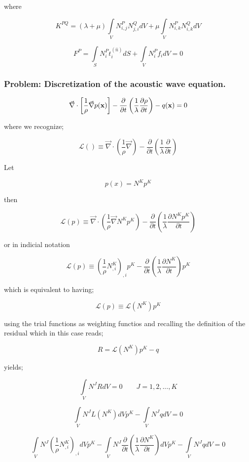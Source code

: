 where

\[{K^{PQ}} = (\lambda  + \mu )\int\limits_V {N_{i,j}^PN_{j,i}^QdV}  + \mu \int\limits_V {N_{i,k}^PN_{i,k}^QdV} \]

\[{F^P} = \int\limits_S {N_i^Pt_i^{(\hat n)}dS + \int\limits_V {N_i^P{f_i}dV = 0} } \]

\subsubsection*{Problem: Discretization of the acoustic wave equation.}

\[\vec \nabla  \cdot \left[ {\frac{1}{\rho }\vec \nabla p(\vb{x})} \right] - \frac{\partial }{{\partial t}}\left( {\frac{1}{\lambda }\frac{{\partial \rho }}{{\partial t}}} \right) - q(\vb{x}) = 0\]

where we recognize;

\[\mathcal{L}() \equiv \vec \nabla  \cdot \left( {\frac{1}{\rho }\vec \nabla } \right) - \frac{\partial }{{\partial t}}\left( {\frac{1}{\lambda }\frac{\partial }{{\partial t}}} \right)\]

Let

\[p(x) = {N^K}{p^K}\]

then

\[\mathcal{L}(p) \equiv \vec \nabla  \cdot \left( {\frac{1}{\rho }\vec \nabla {N^K}{p^K}} \right) - \frac{\partial }{{\partial t}}\left( {\frac{1}{\lambda }\frac{{\partial {N^K}{p^K}}}{{\partial t}}} \right)\]

or in indicial notation

\[\mathcal{L}(p) \equiv {\left( {\frac{1}{\rho }N_{,i}^K} \right)_{,i}}{p^K} - \frac{\partial }{{\partial t}}\left( {\frac{1}{\lambda }\frac{{\partial {N^K}}}{{\partial t}}} \right){p^K}\]

which is equivalent to having;

\[\mathcal{L}(p) \equiv \mathcal{L}({N^K}){p^K}\]

using the trial functions as weighting functios and recalling the definition of the residual which in this case reads;

\[R = \mathcal{L}({N^K}){p^K} - q\]

yields;

\[\int\limits_V {{N^J}RdV = 0} \quad \quad J=1,2,...,K \]

\[\int\limits_V {{N^J}L({N^K})dV{p^K}}  - \int\limits_V {{N^J}qdV}  = 0\]

\[\int\limits_V {{N^J}{{\left( {\frac{1}{\rho }N_{,i}^K} \right)}_{,i}}dV{p^K} - \int\limits_V {{N^J}\frac{\partial }{{\partial t}}\left( {\frac{1}{\lambda }\frac{{\partial {N^K}}}{{\partial t}}} \right)dV{p^K}} }  - \int\limits_V {{N^J}qdV}  = 0\]

